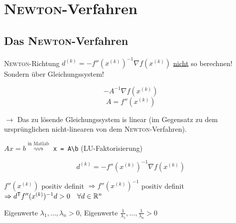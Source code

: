 \chapter{\textsc{Newton}-Verfahren}
\section{Das \textsc{Newton}-Verfahren}
\textsc{Newton}-Richtung $d^{(k)} = -f''\left(x^{(k)}\right)^{-1}\nabla f\left(x^{(k)}\right)$ \underline{nicht} so berechnen!
Sondern über Gleichungssystem!

\[-A^{-1}\nabla f\left(x^{(k)}\right)\]
\[A = f''\left(x^{(k)}\right)\]

$\rightarrow$ Das zu lösende Gleichungssystem is linear (im Gegensatz zu dem ursprünglichen
nicht-linearen von dem \textsc{Newton}-Verfahren).

$Ax = b \overset{\text{in Matlab}}{\rightsquigarrow}$ \texttt{x = A\textbackslash b} (LU-Faktorisierung)

\[d^{(k)} = -f''\left(x^{(k)}\right)^{-1}\nabla f\left(x^{(k)}\right)\]

$f''(x^{(k)})$ positiv definit
$\Rightarrow f''(x^{(k)})^{-1}$ positiv definit
$\Rightarrow d^\mathsf{T} f''(x^{(k)})^{-1}d > 0 \quad \forall d \in \mathbb R^n$

Eigenwerte $\lambda_1, \ldots, \lambda_n > 0$, Eigenwerte $\frac{1}{\lambda_1}, \ldots, \frac{1}{\lambda_n} > 0$


